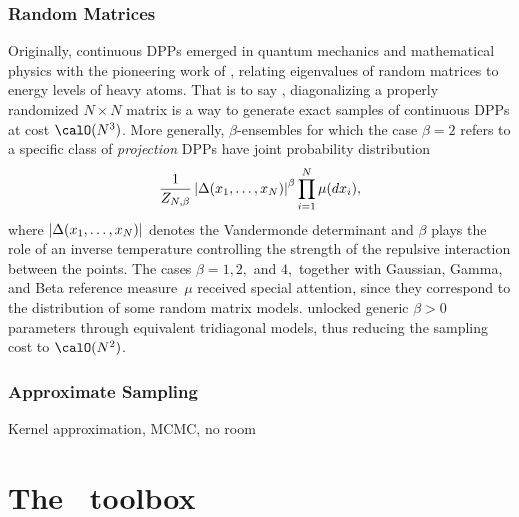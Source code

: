 \documentclass[twoside,11pt]{article}
\begin{document}

    \subsubsection{Random Matrices} %
    \label{ssub:random_matrices}

      Originally, continuous DPPs emerged in quantum mechanics and mathematical physics with the pioneering work of \citet{Wig67}, relating eigenvalues of random matrices to energy levels of heavy atoms.
      That is to say , diagonalizing a properly randomized $N\times N$ matrix is a way to generate exact samples of continuous DPPs at cost $\calO(N^3)$.
      More generally, $\beta$-ensembles for which the case $\beta=2$ refers to a specific class of \textit{projection} DPPs \citep{Kon05} have joint probability distribution
      \begin{equation}
        \frac{1}{Z_{N,\beta}}
        \left| \Delta(x_1,\dots,x_N) \right|^{\beta}
        \prod_{i= 1}^N
          \mu(d x_i),
      \end{equation}
      where $\left| \Delta(x_1,\dots,x_N) \right|$ denotes the Vandermonde determinant and $\beta$ plays the role of an inverse temperature controlling the strength of the repulsive interaction between the points.
      The cases $\beta=1, 2,$ and $4,$ together with Gaussian, Gamma, and Beta reference measure~$\mu$ received special attention, since they correspond to the distribution of some random matrix models.
      \citet{DuEd02} unlocked generic $\beta>0$ parameters through equivalent tridiagonal models, thus reducing the sampling cost to $\calO(N^2)$.


    \subsubsection{Approximate Sampling} %
    \label{ssub:approximate_sampling}

      Kernel approximation, MCMC, no room




\section{The \DPPy\ toolbox} %
\label{sec:the_dppy_toolbox}
\end{document}
